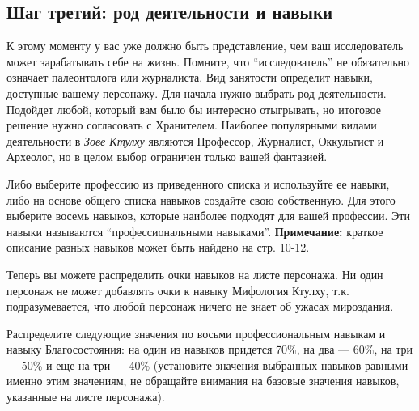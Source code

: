 \documentclass[letterpaper,twocolumn,openany, twoside, 11pt, usenames]{cocbook}
\begin{document}
\subsection*{Шаг третий: род деятельности и навыки}

К этому моменту у вас уже должно быть представление, чем ваш исследователь может зарабатывать себе на жизнь. Помните, что ``исследователь'' не обязательно означает палеонтолога или журналиста. Вид занятости определит навыки, доступные вашему персонажу. Для начала нужно выбрать род деятельности. Подойдет любой, который вам было бы интересно отыгрывать, но итоговое решение нужно согласовать с Хранителем. Наиболее популярными видами деятельности в {\it Зове Ктулху} являются Профессор, Журналист, Оккультист и Археолог, но в целом выбор ограничен только вашей фантазией.

Либо выберите профессию из приведенного списка и используйте ее навыки, либо на основе общего списка навыков создайте свою собственную. Для этого выберите восемь навыков, которые наиболее подходят для вашей профессии. Эти навыки называются ``профессиональными навыками''.
\smallbreak
\noindent \textbf{Примечание:} краткое описание разных навыков может быть найдено на стр. 10-12.
\smallbreak

Теперь вы можете распределить очки навыков на листе персонажа. Ни один персонаж не может добавлять очки к навыку Мифология Ктулху, т.к. подразумевается, что любой персонаж ничего не знает об ужасах мироздания.

Распределите следующие значения по восьми профессиональным навыкам и навыку Благосостояния: на один из навыков придется 70\%, на два --- 60\%, на три --- 50\% и еще на три --- 40\% (установите значения выбранных навыков равными именно этим значениям, не обращайте внимания на базовые значения навыков, указанные на листе персонажа).

\smallbreak

\noindent {}
\end{document}
